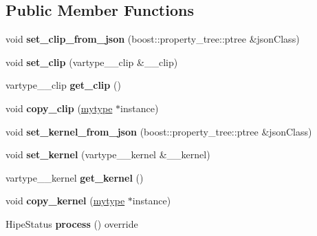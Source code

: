 \subsection*{Public Member Functions}
\begin{DoxyCompactItemize}
\item 
\mbox{\label{classfilter_1_1algos_1_1_equalize_adaptive_aa17780085e82d6e33f77767852db82cb}} 
void {\bfseries set\+\_\+clip\+\_\+from\+\_\+json} (boost\+::property\+\_\+tree\+::ptree \&json\+Class)
\item 
\mbox{\label{classfilter_1_1algos_1_1_equalize_adaptive_ab0b8097aa4a0340f00ae24a074934a97}} 
void {\bfseries set\+\_\+clip} (vartype\+\_\+\+\_\+clip \&\+\_\+\+\_\+clip)
\item 
\mbox{\label{classfilter_1_1algos_1_1_equalize_adaptive_a0f29eb8ccdb8888e43c6e90777edb6fb}} 
vartype\+\_\+\+\_\+clip {\bfseries get\+\_\+clip} ()
\item 
\mbox{\label{classfilter_1_1algos_1_1_equalize_adaptive_af379a2bfdb1cb898407a3cf51da57208}} 
void {\bfseries copy\+\_\+clip} (\hyperlink{classfilter_1_1algos_1_1_equalize_adaptive}{mytype} $\ast$instance)
\item 
\mbox{\label{classfilter_1_1algos_1_1_equalize_adaptive_a84a7322947293f27cd4cdcef660a8a8f}} 
void {\bfseries set\+\_\+kernel\+\_\+from\+\_\+json} (boost\+::property\+\_\+tree\+::ptree \&json\+Class)
\item 
\mbox{\label{classfilter_1_1algos_1_1_equalize_adaptive_aaa3bf471bf037a580903da9311169355}} 
void {\bfseries set\+\_\+kernel} (vartype\+\_\+\+\_\+kernel \&\+\_\+\+\_\+kernel)
\item 
\mbox{\label{classfilter_1_1algos_1_1_equalize_adaptive_a5f0e936b76dd8548d6835aa26c141709}} 
vartype\+\_\+\+\_\+kernel {\bfseries get\+\_\+kernel} ()
\item 
\mbox{\label{classfilter_1_1algos_1_1_equalize_adaptive_af84e3c9a81beeb3aa74357b0450d9289}} 
void {\bfseries copy\+\_\+kernel} (\hyperlink{classfilter_1_1algos_1_1_equalize_adaptive}{mytype} $\ast$instance)
\item 
\mbox{\label{classfilter_1_1algos_1_1_equalize_adaptive_a03d8e13b8a827898f7cef8b171a701a5}} 
Hipe\+Status {\bfseries process} () override
\end{DoxyCompactItemize}
